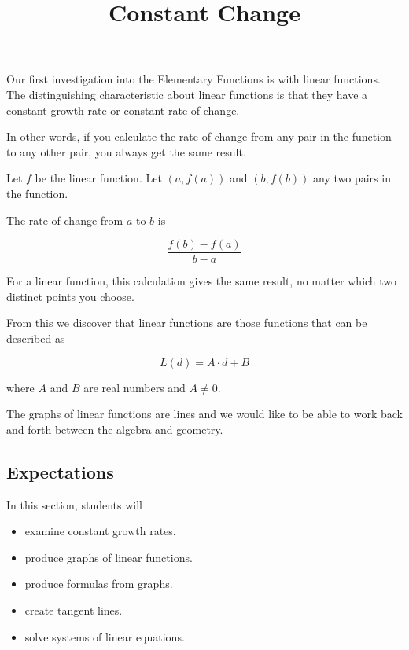 \documentclass{ximera}
\title{Constant Change}
\begin{document}
\begin{abstract}
\end{abstract}
\maketitle









Our first investigation into the Elementary Functions is with linear functions. The distinguishing characteristic about linear functions is that they have a constant growth rate or constant rate of change.  


In other words, if you calculate the rate of change from any pair in the function to any other pair, you always get the same result.

Let $f$ be the linear function.  Let $(a, f(a))$ and $(b, f(b))$ any two pairs in the function.

The rate of change from $a$ to $b$ is 

\[
\frac{f(b) - f(a)}{b-a}
\]


For a linear function, this calculation gives the same result, no matter which two distinct points you choose.













From this we discover that linear functions are those functions that can be described as

\[  L(d) = A \cdot d + B \]

where $A$ and $B$ are real numbers and $A \ne 0$.


The graphs of linear functions are lines and we would like to be able to work back and forth between the algebra and geometry.
















\subsection{Expectations}



\begin{sectionOutcomes}
In this section, students will 

\begin{itemize}
\item examine constant growth rates.
\item produce graphs of linear functions.
\item produce formulas from graphs.
\item create tangent lines.
\item solve systems of linear equations.
\end{itemize}
\end{sectionOutcomes}
\end{document}
